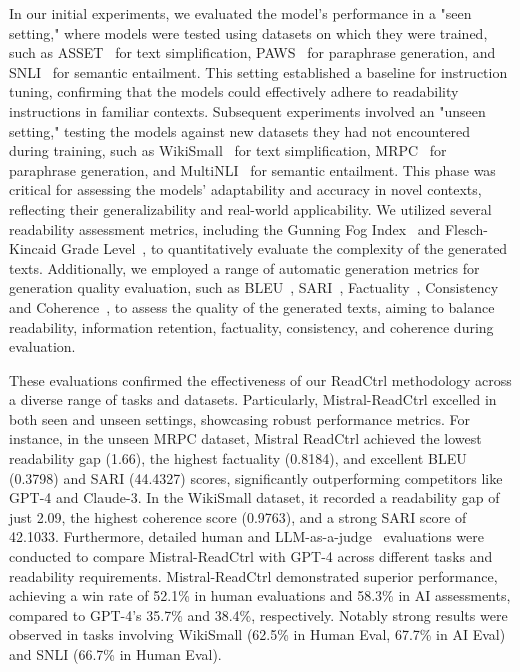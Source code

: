 \documentclass[11pt]{article}
\begin{document}
In our initial experiments, we evaluated the model's performance in a "seen setting," where models were tested using datasets on which they were trained, such as ASSET~\cite{alva2020asset} for text simplification, PAWS~\cite{zhang2019paws} for paraphrase generation, and SNLI~\cite{bowman2015large} for semantic entailment. This setting established a baseline for instruction tuning, confirming that the models could effectively adhere to readability instructions in familiar contexts. Subsequent experiments involved an "unseen setting," testing the models against new datasets they had not encountered during training, such as WikiSmall~\cite{zhu2010monolingual} for text simplification, MRPC~\cite{dolan2005automatically} for paraphrase generation, and MultiNLI~\cite{williams2017broad} for semantic entailment. This phase was critical for assessing the models' adaptability and accuracy in novel contexts, reflecting their generalizability and real-world applicability.
We utilized several readability assessment metrics, including the Gunning Fog Index~\cite{gunning1952technique} and Flesch-Kincaid Grade Level~\cite{kincaid1975derivation}, to quantitatively evaluate the complexity of the generated texts. Additionally, we employed a range of automatic generation metrics for generation quality evaluation, such as BLEU~\cite{papineni2002bleu}, SARI~\cite{xu2016optimizing}, Factuality~\cite{laban2022summac}, Consistency and Coherence~\cite{zhong2022towards}, to assess the quality of the generated texts, aiming to balance readability, information retention, factuality, consistency, and coherence during evaluation.




These evaluations confirmed the effectiveness of our ReadCtrl methodology across a diverse range of tasks and datasets. Particularly, Mistral-ReadCtrl excelled in both seen and unseen settings, showcasing robust performance metrics. For instance, in the unseen MRPC dataset, Mistral ReadCtrl achieved the lowest readability gap (1.66), the highest factuality (0.8184), and excellent BLEU (0.3798) and SARI (44.4327) scores, significantly outperforming competitors like GPT-4 and Claude-3. In the WikiSmall dataset, it recorded a readability gap of just 2.09, the highest coherence score (0.9763), and a strong SARI score of 42.1033.
Furthermore, detailed human and LLM-as-a-judge~\cite{lan2024criticbench} evaluations were conducted to compare Mistral-ReadCtrl with GPT-4 across different tasks and readability requirements. 
Mistral-ReadCtrl demonstrated superior performance, achieving a win rate of 52.1\% in human evaluations and 58.3\% in AI assessments, compared to GPT-4's 35.7\% and 38.4\%, respectively. 
Notably strong results were observed in tasks involving WikiSmall (62.5\% in Human Eval, 67.7\% in AI Eval) and SNLI (66.7\% in Human Eval). 
\end{document}
